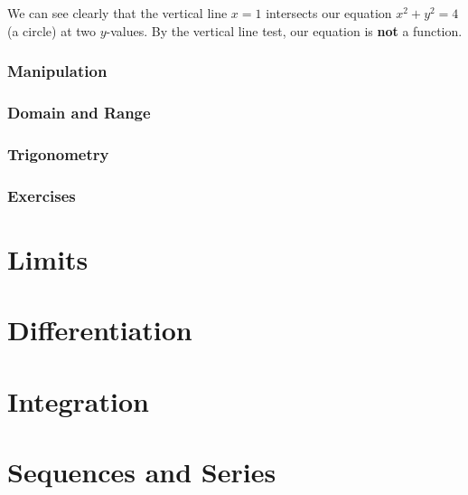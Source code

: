 \documentclass[oneside]{article}
\begin{document}
We can see clearly that the vertical line $x=1$ intersects our equation $x^2 + y^2 = 4$ (a circle) at two $y$-values. By the vertical line test, our equation is \textbf{not} a function.

\subsubsection{Manipulation}
\subsubsection{Domain and Range}
\subsubsection{Trigonometry}
\subsubsection{Exercises}

\section{Limits}

\section{Differentiation}

\section{Integration}

\section{Sequences and Series}
\end{document}
